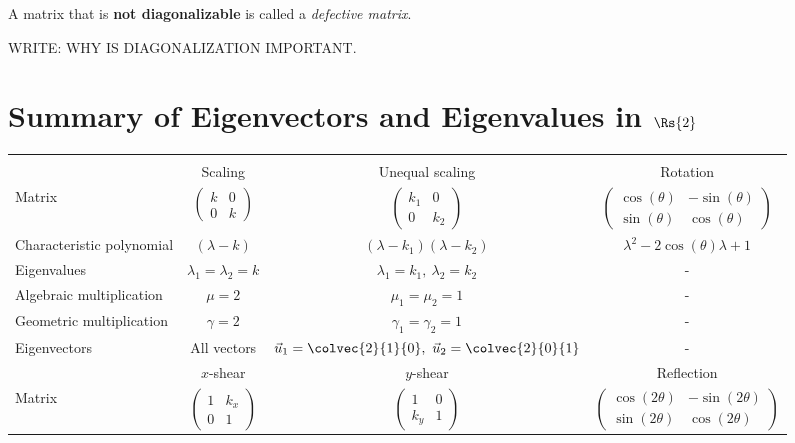 A matrix that is \textbf{not diagonalizable} is called a \emph{defective matrix}.

WRITE: WHY IS DIAGONALIZATION IMPORTANT.

\section{Summary of Eigenvectors and Eigenvalues in $\Rs{2}$}
\centering
\begingroup\setlength{\fboxsep}{0pt}
\colorbox{col2!10}{%
\begin{tabular}{lccc}
  \rowcolor{col2!75}\multicolumn{4}{l}{\color{white}\textbf{Eigenvectors and eigenvalues in $\Rs{2}$}}\\
  \rule{0pt}{4ex}
  & Scaling & Unequal scaling & Rotation \\
  \midrule
  Matrix & $\begin{pmatrix} k & 0 \\ 0 & k \end{pmatrix}$ & $\begin{pmatrix} k_{1} & 0 \\ 0 & k_{2}\end {pmatrix}$ & $\begin{pmatrix} \cos(\theta) & -\sin(\theta) \\ \sin(\theta) & \cos(\theta) \end{pmatrix}$ \\
  Characteristic polynomial & $\left( \lambda-k \right)$ & $\left( \lambda-k_{1} \right)\left( \lambda-k_{2} \right)$ & $\lambda^{2}-2\cos(\theta)\lambda + 1$ \\
  Eigenvalues & $\lambda_{1}=\lambda_{2}=k$ & $\lambda_{1}=k_{1},\ \lambda_{2}=k_{2}$ & - \\
  Algebraic multiplication & $\mu=2$ & $\mu_{1}=\mu_{2}=1$ & - \\
  Geometric multiplication & $\gamma=2$ & $\gamma_{1}=\gamma_{2}=1$ & - \\
  Eigenvectors & All vectors & $\vec{u}_{1}=\colvec{2}{1}{0},\ \vec{u}_{2}=\colvec{2}{0}{1}$ & - \\
  \midrule
  & $x$-shear & $y$-shear & Reflection \\
  \midrule
  Matrix & $\begin{pmatrix} 1 & k_{x} \\ 0 & 1 \end{pmatrix}$ & $\begin{pmatrix} 1 & 0 \\ k_{y} & 1\end {pmatrix}$ & $\begin{pmatrix} \cos(2\theta) & -\sin(2\theta) \\ \sin(2\theta) & \cos(2\theta) \end{pmatrix}$ \\

\end{tabular}}
